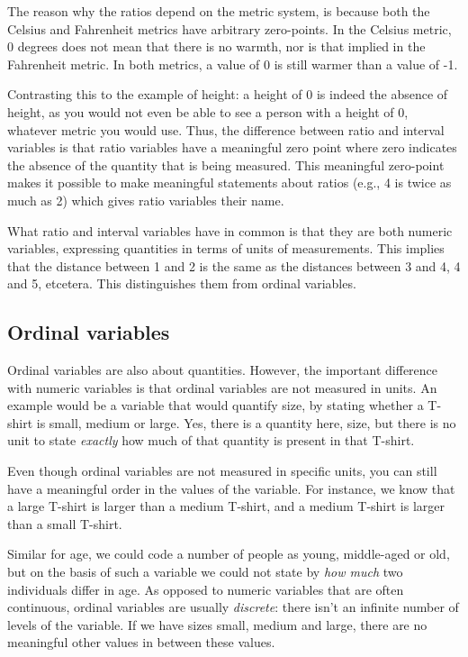 The reason why the ratios depend on the metric system, is because both the Celsius and Fahrenheit metrics have arbitrary zero-points. In the Celsius metric, 0 degrees does not mean that there is no warmth, nor is that implied in the Fahrenheit metric. In both metrics, a value of 0 is still warmer than a value of -1. 

Contrasting this to the example of height: a height of 0 is indeed the absence of height, as you would not even be able to see a person with a height of 0, whatever metric you would use. Thus, the difference between ratio and interval variables is that ratio variables have a meaningful zero point where zero indicates the absence of the quantity that is being measured. This meaningful zero-point makes it possible to make meaningful statements about ratios (e.g., 4 is twice as much as 2) which gives ratio variables their name.

What ratio and interval variables have in common is that they are both numeric variables, expressing quantities in terms of units of measurements. This implies that the distance between 1 and 2 is the same as the distances between 3 and 4, 4 and 5, etcetera. This distinguishes them from ordinal variables. 




\subsection{Ordinal variables}

Ordinal variables are also about quantities. However, the important difference with numeric variables is that ordinal variables are not measured in units. An example would be a variable that would quantify size, by stating whether a T-shirt is small, medium or large. Yes, there is a quantity here, size, but there is no unit to state \textit{exactly} how much of that quantity is present in that T-shirt.

Even though ordinal variables are not measured in specific units, you can still have a meaningful order in the values of the variable. For instance, we know that a large T-shirt is larger than a medium T-shirt, and a medium T-shirt is larger than a small T-shirt.

Similar for age, we could code a number of people as young, middle-aged or old, but on the basis of such a variable we could not state by \textit{how much} two individuals differ in age. As opposed to numeric variables that are often continuous, ordinal variables are usually \textit{discrete}: there isn't an infinite number of levels of the variable. If we have sizes small, medium and large, there are no meaningful other values in between these values.

